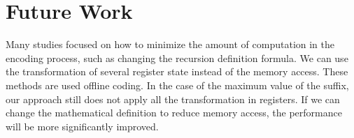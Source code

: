 \section{Future Work}
\label{sec:Future}

Many studies focused on how to minimize the amount of computation in
the encoding process, such as changing the recursion definition
formula.  We can use the transformation of several register state
instead of the memory access.  These methods are used offline coding.
In the case of the maximum value of the suffix,  our approach still
does not apply all the transformation in registers.  If we can change
the mathematical definition to reduce memory access, the performance
will be more significantly improved.
